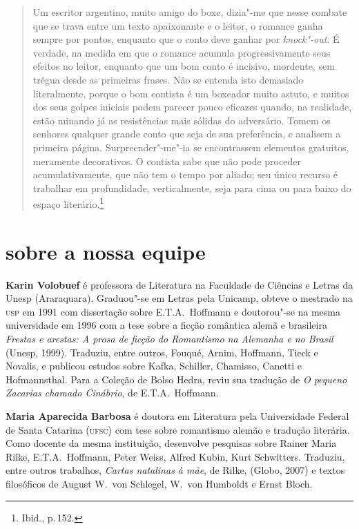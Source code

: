 \begin{quote}
Um escritor argentino, muito amigo do boxe, dizia"-me que nesse combate que se trava entre um texto apaixonante e o leitor, o romance ganha sempre por pontos, enquanto que o conto deve ganhar por \textit{knock"-out}. É verdade, na medida em que o romance acumula progressivamente seus efeitos no leitor, enquanto que um bom conto é incisivo, mordente, sem trégua desde as primeiras frases. Não se entenda isto demasiado literalmente, porque o bom contista é um boxeador muito astuto, e muitos dos seus golpes iniciais podem parecer pouco eficazes quando, na realidade, estão minando já as resistências mais sólidas do adversário.
Tomem os senhores qualquer grande conto que seja de sua preferência, e analisem a primeira página. Surpreender"-me"-ia se encontrassem elementos gratuitos, meramente decorativos. O contista sabe que não pode proceder acumulativamente, que não tem o tempo por aliado; seu único recurso é trabalhar em profundidade, verticalmente, seja para cima ou para baixo do espaço literário.\footnote{Ibid., p.\,152.}
\end{quote}

\section*{sobre a nossa equipe}

\textbf{Karin Volobuef} é professora de Literatura na Faculdade de Ciências e
Letras da Unesp (Araraquara). Graduou"-se em Letras pela Unicamp, obteve
o mestrado na \textsc{usp} em 1991 com dissertação sobre E.T.A.~Hoffmann e doutorou"-se
na mesma universidade em 1996 com a tese sobre a ficção romântica alemã 
e brasileira \textit{Frestas e arestas: A prosa de ficção do Romantismo 
na Alemanha e no Brasil} (Unesp, 1999). Traduziu, entre outros, 
Fouqué, Arnim, Hoffmann, Tieck e Novalis, e publicou estudos sobre Kafka, 
Schiller, Chamisso, Canetti e Hofmannsthal. Para a Coleção de Bolso Hedra, 
reviu sua tradução de \textit{O pequeno Zacarias chamado Cinábrio}, de E.T.A.~Hoffmann. 

\textbf{Maria Aparecida Barbosa} é doutora em Literatura pela Universidade
Federal de Santa Catarina (\textsc{ufsc}) com tese sobre romantismo alemão e tradução 
literária. Como docente da mesma instituição, desenvolve pesquisas sobre Rainer 
Maria Rilke, E.T.A.~Hoffmann, Peter Weiss, Alfred Kubin, Kurt Schwitters. 
Traduziu, entre outros trabalhos, \textit{Cartas natalinas à mãe}, de Rilke, (Globo, 2007) 
e textos filosóficos de August W.~von Schlegel, W.~von Humboldt e Ernst Bloch.

